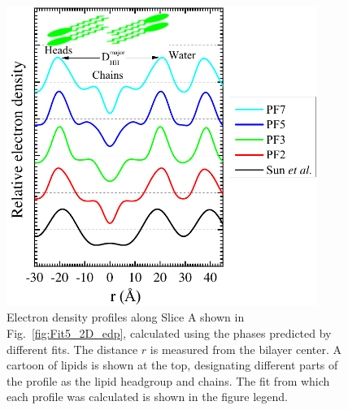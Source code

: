 \begin{figure}[htbp]
  \centering
  \includegraphics[width=0.9\textwidth]{figures/ripple/LAXS/major_diff_models}
  \caption{Electron density profiles along Slice A shown in Fig.~\ref{fig:Fit5_2D_edp}, 
  calculated using the phases
  predicted by different fits. The distance $r$ is measured from the bilayer 
  center. A cartoon of lipids is shown at the top, designating different parts of the profile
  as the lipid headgroup and chains. The fit from which each profile was calculated
  is shown in the figure legend.}
  \label{fig:major_diff_models}
\end{figure}

